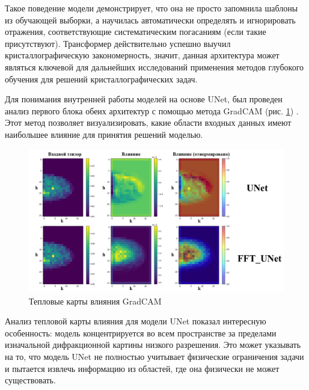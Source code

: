 Такое поведение модели демонстрирует, что она не просто запомнила шаблоны из обучающей выборки, а научилась автоматически определять и игнорировать отражения, соответствующие систематическим погасаниям (если такие присутствуют). Трансформер действительно успешно выучил кристаллографическую закономерность, значит, данная архитектура может являться ключевой для дальнейших исследований применения методов глубокого обучения для решений кристаллографических задач.

Для понимания внутренней работы моделей на основе UNet, был проведен анализ первого блока обеих архитектур с помощью метода GradCAM (рис. \ref{gradcam}) \cite{selvaraju_grad-cam_2020}. Этот метод позволяет визуализировать, какие области входных данных имеют наибольшее влияние для принятия решений моделью.


\begin{figure}[H]
     \centering
     \includegraphics[width=1\textwidth]{figures/attribute_map.png}
     \caption{Тепловые карты влияния GradCAM}
     \label{gradcam}
\end{figure}

%

Анализ тепловой карты влияния для модели UNet показал интересную особенность: модель концентрируется во всем пространстве за пределами изначальной дифракционной картины низкого разрешения. Это может указывать на то, что модель UNet не полностью учитывает физические ограничения задачи и пытается извлечь информацию из областей, где она физически не может существовать. 


